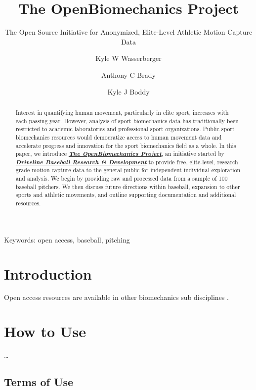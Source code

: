 \documentclass[
]{article}
\author[1,$\dagger$]{\footnotesize Kyle W Wasserberger}
\author[1]{\footnotesize Anthony C Brady}
\author[1]{\footnotesize Kyle J Boddy}
\affil[1]{\footnotesize Research \& Development; Driveline Baseball}
\affil[$\dagger$]{\footnotesize Corresponding author: kyle.wasserberger@drivelinebaseball.com}
\title{The OpenBiomechanics Project}
\subtitle{The Open Source Initiative for Anonymized, Elite-Level Athletic Motion Capture Data}
\date{\vspace{-2.5em}}
\begin{document}
\maketitle

\begin{center}
Keywords: open access, baseball, pitching
\end{center}

\bigskip
\bigskip
\begin{abstract}
\doublespacing
Interest in quantifying human movement, particularly in elite sport, increases with each passing year. However, analysis of sport biomechanics data has traditionally been restricted to academic laboratories and professional sport organizations. Public sport biomechanics resources would democratize access to human movement data and accelerate progress and innovation for the sport biomechanics field as a whole. In this paper, we introduce \href{www.openbiomechanics.org}{\textbf{\textit{The OpenBiomechanics Project}}}, an initiative started by \href{https://www.drivelinebaseball.com/research/}{\textbf{\textit{Driveline Baseball Research \& Development}}} to provide free, elite-level, research grade motion capture data to the general public for independent individual exploration and analysis. We begin by providing raw and processed data from a sample of 100 baseball pitchers. We then discuss future directions within baseball, expansion to other sports and athletic movements, and outline supporting documentation and additional resources.
\end{abstract}

\newpage

\hypertarget{introduction}{%
\section{Introduction}\label{introduction}}

Open access resources are available in other biomechanics sub disciplines \cite{erdemir2016open}.

\hypertarget{how-to-use}{%
\section{How to Use}\label{how-to-use}}

\ldots{}

\hypertarget{terms-of-use}{%
\subsection{Terms of Use}\label{terms-of-use}}
\end{document}

